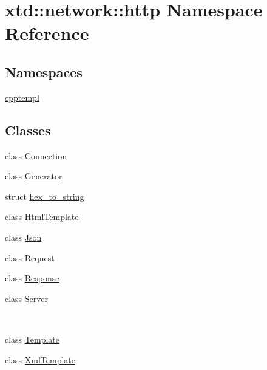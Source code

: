 \hypertarget{namespacextd_1_1network_1_1http}{}\section{xtd\+:\+:network\+:\+:http Namespace Reference}
\label{namespacextd_1_1network_1_1http}
\subsection*{Namespaces}
\begin{DoxyCompactItemize}
\item 
 \hyperlink{namespacextd_1_1network_1_1http_1_1cpptempl}{cpptempl}
\end{DoxyCompactItemize}
\subsection*{Classes}
\begin{DoxyCompactItemize}
\item 
class \hyperlink{classxtd_1_1network_1_1http_1_1Connection}{Connection}
\item 
class \hyperlink{classxtd_1_1network_1_1http_1_1Generator}{Generator}
\item 
struct \hyperlink{structxtd_1_1network_1_1http_1_1hex__to__string}{hex\+\_\+to\+\_\+string}
\item 
class \hyperlink{classxtd_1_1network_1_1http_1_1HtmlTemplate}{Html\+Template}
\item 
class \hyperlink{classxtd_1_1network_1_1http_1_1Json}{Json}
\item 
class \hyperlink{classxtd_1_1network_1_1http_1_1Request}{Request}
\item 
class \hyperlink{classxtd_1_1network_1_1http_1_1Response}{Response}
\item 
class \hyperlink{classxtd_1_1network_1_1http_1_1Server}{Server}
\begin{DoxyCompactList}\small\item\em ~\newline
~\newline
 \end{DoxyCompactList}\item 
class \hyperlink{classxtd_1_1network_1_1http_1_1Template}{Template}
\item 
class \hyperlink{classxtd_1_1network_1_1http_1_1XmlTemplate}{Xml\+Template}
\end{DoxyCompactItemize}
